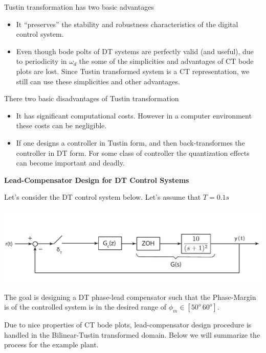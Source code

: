 \documentclass[twoside]{article}
\begin{document}
Tustin transformation has two basic advantages
%
\begin{itemize}
  \item It ``preserves'' the stability and robustness 
   characteristics of the digital control system.
  \item Even though bode polts of DT systems 
   are perfectly valid (and useful), due to periodicity in
   $\omega_d$ the some of the simplicities and
   advantages of CT bode plots are lost. Since Tustin
   transformed system is a CT representation, we
   still can use these simplicities and other advantages.
\end{itemize}

There two basic disadvantages of Tustin transformation
\begin{itemize}
  \item It has significant computational costs. However in 
   a computer environment these costs can be negligible.
  \item If one designs a controller in Tustin form, and then
  back-transformes the controller in DT form. For some class
  of controller the quantization effects can become important
   and deadly. 
\end{itemize}

\newpage

\textbf{Lead-Compensator Design for DT Control Systems}

Let's consider the DT control system below. Let's assume 
that $T = 0.1 s$
%
     \begin{center}
 \begin{minipage}[h]{\linewidth}
     \begin{center}
       \includegraphics[width=\textwidth]{mainblock}
     \end{center}
 \end{minipage}
     \end{center}
%
The goal is designing a DT phase-lead compensator such that
the Phase-Margin is of the controlled system is in the desired 
range of $\phi_m \in [50^o \, 60^o]$.

Due to nice properties of CT bode plots, lead-compensator design 
procedure is handled in the Bilinear-Tustin transformed domain.
Below we will summarize the process for the example plant.
\end{document}
